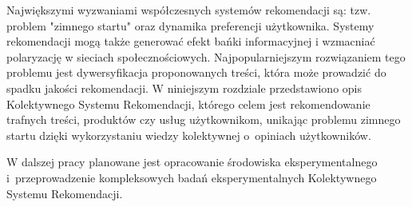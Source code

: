 Największymi wyzwaniami współczesnych systemów rekomendacji są: tzw. problem "zimnego startu" oraz dynamika preferencji użytkownika. Systemy rekomendacji mogą także generować efekt bańki informacyjnej i wzmacniać polaryzację w sieciach społecznościowych. Najpopularniejszym rozwiązaniem tego problemu jest dywersyfikacja proponowanych treści, która może prowadzić do spadku jakości rekomendacji. W niniejszym rozdziale przedstawiono opis Kolektywnego Systemu Rekomendacji, którego celem jest rekomendowanie trafnych treści, produktów czy usług użytkownikom, unikając problemu zimnego startu dzięki wykorzystaniu wiedzy kolektywnej o~opiniach użytkowników.

W dalszej pracy planowane jest opracowanie środowiska eksperymentalnego i~przeprowadzenie kompleksowych badań eksperymentalnych Kolektywnego Systemu Rekomendacji.

